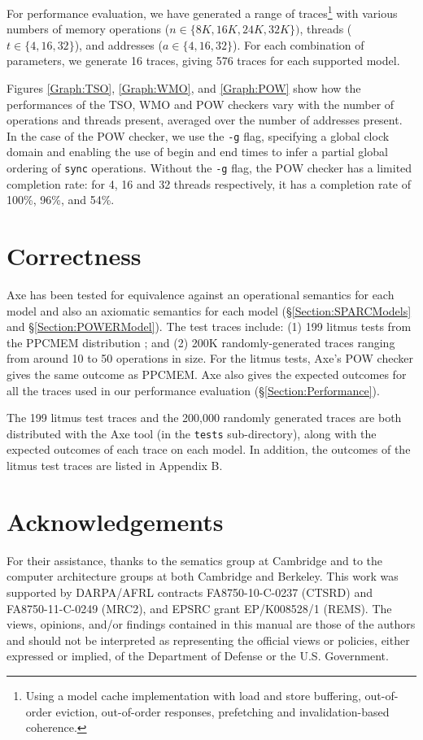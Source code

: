 \documentclass[11pt]{article}
\begin{document}
For performance evaluation, we have generated a range of
traces\footnote{Using a model cache implementation 
with load and store buffering, out-of-order eviction,
out-of-order responses, prefetching and invalidation-based coherence.}
with various numbers of memory operations ($n \in \{8K, 16K, 24K,
32K\})$, threads ($t \in \{4, 16, 32\}$), and addresses ($a \in \{4,
16, 32\}$).  For each combination of parameters, we generate 16
traces, giving 576 traces for each supported model.

Figures \ref{Graph:TSO}, \ref{Graph:WMO}, and \ref{Graph:POW} show how
the performances of the TSO, WMO and POW checkers vary with the number
of operations and threads present, averaged over the number of
addresses present.  In the case of the POW checker, we use the
\verb!-g! flag, specifying a global clock domain and 
enabling the use of begin and end times to infer a partial global
ordering of \verb!sync! operations.  Without the \verb!-g! flag, the
POW checker has a limited completion rate: for 4, 16 and 32 threads
respectively, it has a completion rate of 100\%, 96\%, and 54\%.

\section{Correctness}
\label{Section:Correctness}

Axe has been tested for equivalence against an operational semantics
for each model and also an axiomatic semantics for each model
(\S\ref{Section:SPARCModels} and \S\ref{Section:POWERModel}).  The
test traces include: (1) 199 litmus tests from the PPCMEM distribution
\cite{PPCMEM}; and (2) 200K randomly-generated traces ranging from
around 10 to 50 operations in size.  For the litmus tests, Axe's POW
checker gives the same outcome as PPCMEM.  Axe also gives the expected
outcomes for all the traces used in our performance evaluation
(\S\ref{Section:Performance}).  

The 199 litmus test traces and the 200,000 randomly generated traces are
both distributed with the Axe tool (in the \verb!tests!
sub-directory), along with the expected outcomes of each trace on each
model.  In addition, the outcomes of the litmus test traces are listed
in Appendix B.

\section*{Acknowledgements}

For their assistance, thanks to the sematics group at Cambridge and to the
computer architecture groups at both Cambridge and Berkeley.  This work was
supported by DARPA/AFRL contracts FA8750-10-C-0237 (CTSRD) and FA8750-11-C-0249
(MRC2), and EPSRC grant EP/K008528/1 (REMS).  The views, opinions, and/or
findings contained in this manual are those of the authors and should not be
interpreted as representing the official views or policies, either expressed or
implied, of the Department of Defense or the U.S.  Government.
\end{document}

